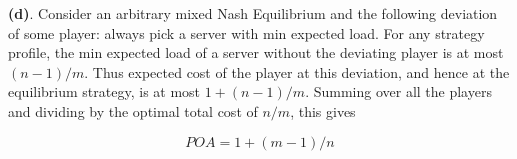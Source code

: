 \textbf{(d)}. Consider an arbitrary mixed Nash Equilibrium and the following deviation of some player: always pick a server with min expected load. For any strategy profile, the min expected load of a server without the deviating player is at most $(n-1)/m$. Thus expected cost of the player at this deviation, and hence at the equilibrium strategy, is at most $1+(n-1)/m$. Summing over all the players and dividing by the optimal total cost of $n/m$, this gives

$$POA = 1+(m-1)/n$$